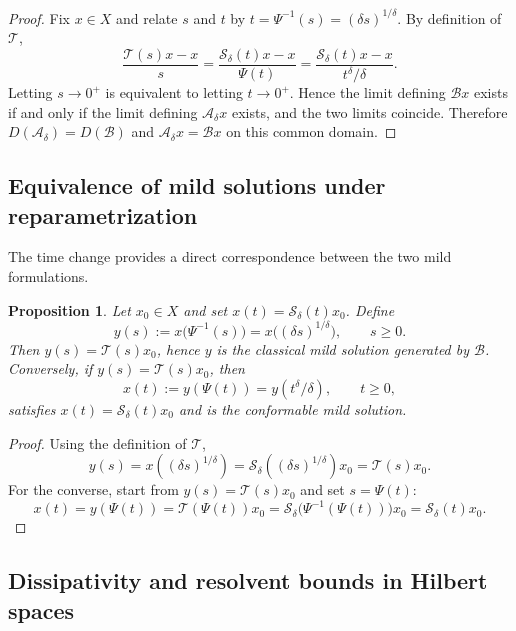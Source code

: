 \documentclass[preprint,12pt]{elsarticle}
\newtheorem{proposition}{Proposition}
\newtheorem{proof}{Proof}
\begin{document}
\begin{proof}
Fix $x\in X$ and relate $s$ and $t$ by $t=\Psi^{-1}(s)=(\delta s)^{1/\delta}$.
By definition of $\mathcal T$,
\[
\frac{\mathcal T(s)x-x}{s}
=
\frac{\mathcal S_\delta(t)x-x}{\Psi(t)}
=
\frac{\mathcal S_\delta(t)x-x}{t^\delta/\delta}.
\]
Letting $s\to0^+$ is equivalent to letting $t\to0^+$.
Hence the limit defining $\mathcal Bx$ exists if and only if the limit defining
$\mathcal A_\delta x$ exists, and the two limits coincide.
Therefore $D(\mathcal A_\delta)=D(\mathcal B)$ and $\mathcal A_\delta x=\mathcal Bx$
on this common domain.
\end{proof}

\subsection*{Equivalence of mild solutions under reparametrization}

The time change provides a direct correspondence between the two mild
formulations.

\begin{proposition}\label{prop:correspondence_combined}
Let $x_0\in X$ and set $x(t)=\mathcal S_\delta(t)x_0$.
Define
\[
y(s):=x\bigl(\Psi^{-1}(s)\bigr)=x\bigl((\delta s)^{1/\delta}\bigr),
\qquad s\ge0.
\]
Then $y(s)=\mathcal T(s)x_0$, hence $y$ is the classical mild solution generated by
$\mathcal B$.
Conversely, if $y(s)=\mathcal T(s)x_0$, then
\[
x(t):=y(\Psi(t))=y(t^\delta/\delta),\qquad t\ge0,
\]
satisfies $x(t)=\mathcal S_\delta(t)x_0$ and is the conformable mild solution.
\end{proposition}

\begin{proof}
Using the definition of $\mathcal T$,
\[
y(s)=x((\delta s)^{1/\delta})
=\mathcal S_\delta((\delta s)^{1/\delta})x_0
=\mathcal T(s)x_0.
\]
For the converse, start from $y(s)=\mathcal T(s)x_0$ and set $s=\Psi(t)$:
\[
x(t)=y(\Psi(t))
=\mathcal T(\Psi(t))x_0
=\mathcal S_\delta\!\bigl(\Psi^{-1}(\Psi(t))\bigr)x_0
=\mathcal S_\delta(t)x_0.
\]
\end{proof}

\subsection*{Dissipativity and resolvent bounds in Hilbert spaces}
\end{document}
